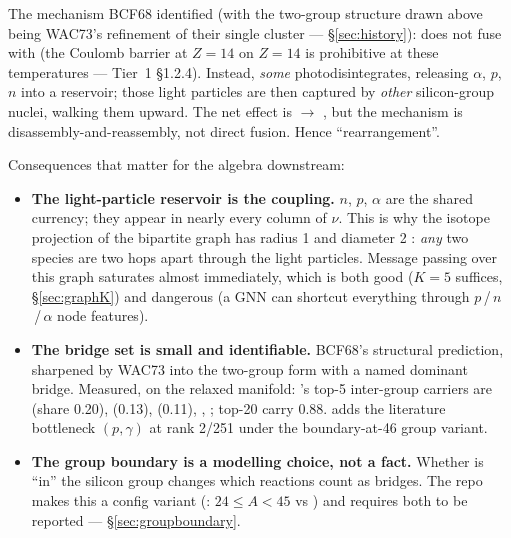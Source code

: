The mechanism BCF68 identified (with the two-group structure drawn above being
WAC73's refinement of their single cluster --- \S\ref{sec:history}):
 does not fuse with  (the Coulomb barrier at $Z = 14$ on
$Z = 14$ is prohibitive at these temperatures --- Tier~1 \S1.2.4). Instead,
\emph{some}  photodisintegrates, releasing $\alpha$, $p$, $n$ into a
reservoir; those light particles are then captured by \emph{other}
silicon-group nuclei, walking them upward. The net effect is
 $\to$ , but the mechanism is
disassembly-and-reassembly, not direct fusion. Hence ``rearrangement''.

Consequences that matter for the algebra downstream:

\begin{itemize}
\item \textbf{The light-particle reservoir is the coupling.} $n$, $p$, $\alpha$
  are the shared currency; they appear in nearly every column of $\nu$. This is
  why the isotope projection of the bipartite graph has radius 1 and diameter 2
  : \emph{any} two species are two hops apart through the
  light particles. Message passing over this graph saturates almost immediately,
  which is both good ($K = 5$ suffices, \S\ref{sec:graphK}) and dangerous (a GNN
  can shortcut everything through $p$\,/\,$n$\,/\,$\alpha$ node features).
\item \textbf{The bridge set is small and identifiable.} BCF68's structural
  prediction, sharpened by WAC73 into the two-group form with a named dominant
  bridge. Measured, on the relaxed manifold: 's top-5 inter-group
  carriers are  (share 0.20),  (0.13),
   (0.11), , ;
  top-20 carry 0.88.  adds the literature bottleneck
  $(p,\gamma)$ \citep[\S VIb: ``always the dominant, or
  at least one of the dominant, flows linking the two groups''; reaffirmed by
  \citealp{ht1996}]{wac1973} at rank 2/251 under the boundary-at-46 group
  variant. 
\item \textbf{The group boundary is a modelling choice, not a fact.} Whether
   is ``in'' the silicon group changes which reactions count as
  bridges. The repo makes this a config variant
  (:  $24 \le A < 45$ vs
  ) and requires both to be reported ---
  \S\ref{sec:groupboundary}.
\end{itemize}

